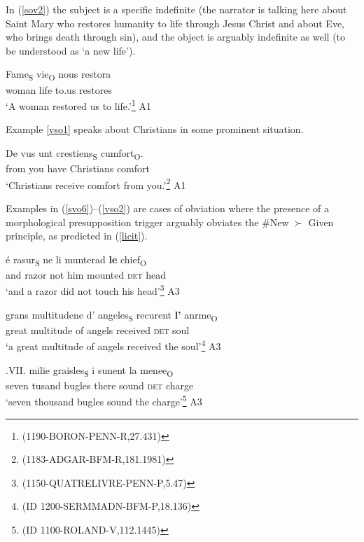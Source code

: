 \documentclass[output=paper,modfonts,nonflat]{langsci/langscibook}
\begin{document}
In (\ref{sov2}) the subject is a specific indefinite (the narrator is talking here about Saint Mary who restores humanity to life through Jesus Christ and about Eve, who brings death through sin), and the object is arguably indefinite as well (to be understood as  `a new life').

\ea
\gll Fame\textsubscript{S} vie\textsubscript{O} nous restora\\
woman life to.us restores\\
\glt `A woman restored us to life.'\footnote{{(1190-BORON-PENN-R,27.431)}}\label{sov2} \hfill A1
\z

Example \ref{vso1} speaks about Christians in some prominent situation.

\ea
\gll De vus unt crestiens\textsubscript{S} cumfort\textsubscript{O}.\\
from you have Christians comfort\\
\glt `Christians receive comfort from you.'\footnote{{(1183-ADGAR-BFM-R,181.1981)}}\label{vso1} \hfill A1
\z

Examples in (\ref{svo6})--(\ref{vso2}) are cases of obviation where the presence of a morphological presupposition trigger arguably obviates the \#New $\succ$ Given principle, as predicted in (\ref{licit}).

\ea
\gll \'{e} rasur\textsubscript{S} ne li munterad {\bfseries le} chief\textsubscript{O}\\
and razor not him mounted {\scshape det} head\\
\glt `and a razor did not touch his head'\footnote{{(1150-QUATRELIVRE-PENN-P,5.47)}}\label{svo6} \hfill A3
\z

\ea
\gll grans multitudene d' angeles\textsubscript{S} recurent {\bfseries l'} anrme\textsubscript{O}\\
great multitude of angels received {\scshape det} soul\\
\glt `a great multitude of angels received the soul'\footnote{{(ID 1200-SERMMADN-BFM-P,18.136)}}\label{svo7} \hfill A3
\z



\ea
\gll .VII. milie graisles\textsubscript{S} i sunent la menee\textsubscript{O}\\
seven tusand bugles there sound {\scshape det} charge\\
\glt  `seven thousand bugles sound the charge'\footnote{{(ID 1100-ROLAND-V,112.1445)}}\label{sov3}  \hfill A3
\z
\end{document}
